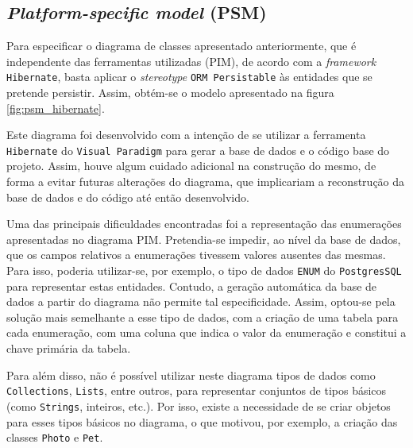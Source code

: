 \subsection{\textit{Platform-specific model} (PSM)}

Para especificar o diagrama de classes apresentado anteriormente, que é independente das ferramentas utilizadas (PIM), de acordo com a \textit{framework} \texttt{Hibernate}, basta aplicar o \textit{stereotype} \texttt{ORM Persistable} às entidades que se pretende persistir. Assim, obtém-se o modelo apresentado na figura \ref{fig:psm_hibernate}.

Este diagrama foi desenvolvido com a intenção de se utilizar a ferramenta \texttt{Hibernate} do \texttt{Visual Paradigm} para gerar a base de dados e o código base do projeto. Assim, houve algum cuidado adicional na construção do mesmo, de forma a evitar futuras alterações do diagrama, que implicariam a reconstrução da base de dados e do código até então desenvolvido.

Uma das principais dificuldades encontradas foi a representação das enumerações apresentadas no diagrama PIM. Pretendia-se impedir, ao nível da base de dados, que os campos relativos a enumerações tivessem valores ausentes das mesmas. Para isso, poderia utilizar-se, por exemplo, o tipo de dados \texttt{ENUM} do \texttt{PostgresSQL} para representar estas entidades. Contudo, a geração automática da base de dados a partir do diagrama não permite tal especificidade. Assim, optou-se pela solução mais semelhante a esse tipo de dados, com a criação de uma tabela para cada enumeração, com uma coluna que indica o valor da enumeração e constitui a chave primária da tabela.

Para além disso, não é possível utilizar neste diagrama tipos de dados como \texttt{Collections}, \texttt{Lists}, entre outros, para representar conjuntos de tipos básicos (como \texttt{Strings}, inteiros, etc.). Por isso, existe a necessidade de se criar objetos para esses tipos básicos no diagrama, o que motivou, por exemplo, a criação das classes \texttt{Photo} e \texttt{Pet}.


